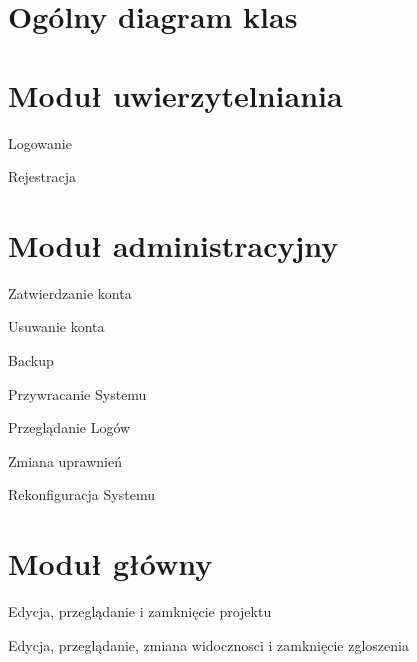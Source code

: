 \section{Ogólny diagram klas}


\section{Moduł uwierzytelniania}

\begin{class}{Logowanie}
\end{class}

\begin{class}{Rejestracja}
\end{class}

\section{Moduł administracyjny}

\begin{class}{Zatwierdzanie konta}
\end{class}

\begin{class}{Usuwanie konta}
\end{class}

\begin{class}{Backup}
\end{class}

\begin{class}{Przywracanie Systemu}
\end{class}

\begin{class}{Przeglądanie Logów}
\end{class}

\begin{class}{Zmiana uprawnień}
\end{class}

\begin{class}{Rekonfiguracja Systemu}
\end{class}

\section{Moduł główny}
\begin{class}{Edycja, przeglądanie i zamknięcie projektu}
\end{class}

\begin{class}{Edycja, przeglądanie, zmiana widocznosci i zamknięcie zgloszenia}
\end{class}



